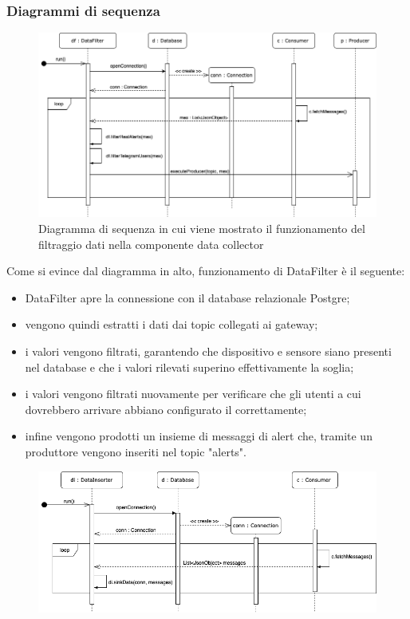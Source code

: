 		\begin{landscape}
		\subsubsection{Diagrammi di sequenza}%
			\begin{figure}[H]
				\centering
				\includegraphics[scale=0.550]{res/images/DATACOLLECTOR/DataFilter.ThreadsKafkaDataCollector.png}
				\caption{Diagramma di sequenza in cui viene mostrato il funzionamento del filtraggio dati nella componente data collector}
				\label{Diagramma 7}
			\end{figure}
			Come si evince dal diagramma in alto, funzionamento di DataFilter è il seguente:
			\begin{itemize}
				\item DataFilter apre la connessione con il database relazionale Postgre;
				\item vengono quindi estratti i dati dai topic  collegati ai gateway;
				\item i valori vengono filtrati, garantendo che dispositivo e sensore siano presenti nel database e che i valori rilevati superino effettivamente la soglia;
				\item i valori vengono filtrati nuovamente per verificare che gli utenti a cui dovrebbero arrivare abbiano configurato il  correttamente;
				\item infine vengono prodotti un insieme di messaggi di alert che, tramite un produttore vengono inseriti nel topic  "alerts". 
			\end{itemize}
			\begin{figure}[H]
				\centering
				\includegraphics[scale=0.550]{res/images/DATACOLLECTOR/DataInserter.ThreadsKafkaDataCollector.png}

\end{figure}
\end{landscape}
